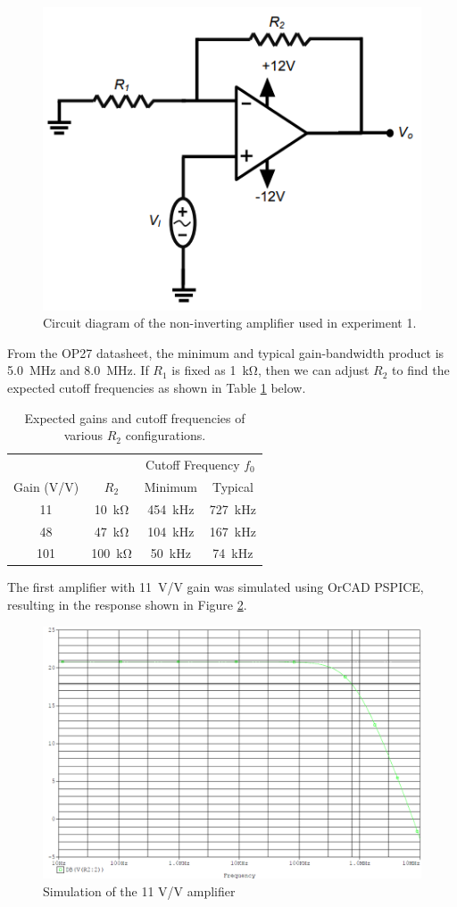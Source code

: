 \documentclass{report}
\begin{document}
\begin{figure}[h]
	\centering
	\includegraphics[width=0.5\linewidth]{exp1ckt}
	\caption{Circuit diagram of the non-inverting amplifier used in experiment 1.}
	\label{fig:exp1ckt}
\end{figure}

From the OP27 datasheet, the minimum and typical gain-bandwidth product is \SI{5.0}{\MHz} and \SI{8.0}{\MHz}. If $R_1$ is fixed as \SI{1}{\kohm}, then we can adjust $R_2$ to find the expected cutoff frequencies as shown in Table 
\ref{table:exp1gains} below.

\begin{table}[H]
	\centering
	\caption{Expected gains and cutoff frequencies of various $R_2$ configurations.}
	\label{table:exp1gains}
	\begin{threeparttable}
		\begin{tabular}{cccc}
			\toprule
			& & \multicolumn{2}{c}{Cutoff Frequency $f_0$} \\
			Gain (V/V) & $R_2$ & Minimum & Typical \\
			\midrule
			11 & \SI{10}{\kohm} & \SI{454}{\kHz} & \SI{727}{\kHz} \\
			48 & \SI{47}{\kohm} & \SI{104}{\kHz} & \SI{167}{\kHz}\\
			101 & \SI{100}{\kohm} & \SI{50}{\kHz} & \SI{74}{\kHz} \\
			\bottomrule
		\end{tabular}
	\end{threeparttable}
\end{table}

The first amplifier with \SI{11}{\V/\V} gain was simulated using OrCAD PSPICE, resulting in the response shown in Figure \ref{fig:exp1sim}.

\begin{figure}[H]
	\centering
	\includegraphics[width=0.7\linewidth]{exp1sim}
	\caption{Simulation of the 11 V/V amplifier}
	\label{fig:exp1sim}
\end{figure}
\end{document}
